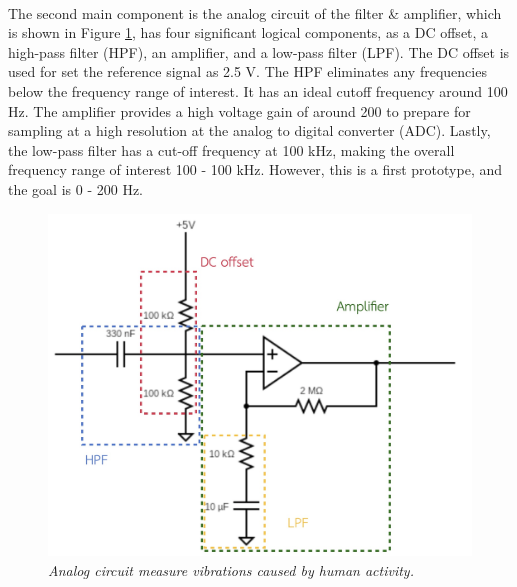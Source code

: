 \paragraph{}
The second main component is the analog circuit of the filter \& amplifier, which is shown in Figure \ref{fig:analog_circuit}, has four significant logical components, as a DC offset, a high-pass filter (HPF), an amplifier, and a low-pass filter (LPF). The DC offset is used for set the reference signal as 2.5 V. The HPF eliminates any frequencies below the frequency range of interest. It has an ideal cutoff frequency around 100 Hz. The amplifier provides a high voltage gain of around 200 to prepare for sampling at a high resolution at the analog to digital converter (ADC). Lastly, the low-pass filter has a cut-off frequency at 100 kHz, making the overall frequency range of interest 100 - 100 kHz. However, this is a first prototype, and the goal is 0 - 200 Hz.

\begin{figure}[H]
  \centering
  \caption[Analog circuit measure vibrations caused by human activity.]{\emph{Analog circuit measure vibrations caused by human activity.}}\label{fig:analog_circuit}
  \includegraphics[scale = 0.2]{figures/analogcircuit.jpg}  
\end{figure}

